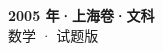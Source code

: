 \documentclass[zihao=-4, a4paper]{ctexart}
\begin{document}
\begin{center}
  {\Large\bfseries 2005 年·上海卷·文科}\\[4pt]
  {\large 数学 · 试题版}
\end{center}
\medskip
{}

\end{document}
